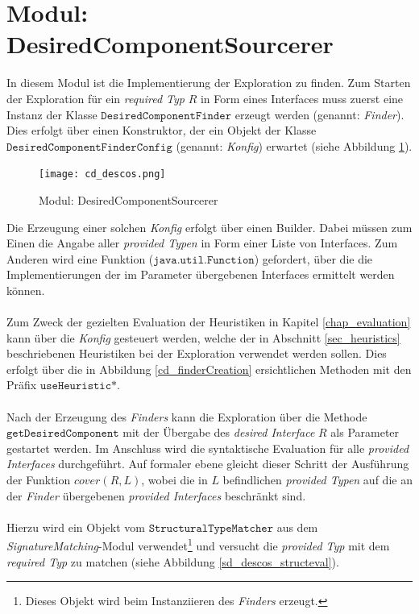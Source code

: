 \section{Modul: DesiredComponentSourcerer}\label{sec_impl_descos}
In diesem Modul ist die Implementierung der Exploration zu finden. Zum Starten der Exploration für ein \emph{required Typ} $R$ in Form eines Interfaces muss zuerst eine Instanz der Klasse $\texttt{DesiredComponentFinder}$ erzeugt werden (genannt: \emph{Finder}). Dies erfolgt über einen Konstruktor, der ein Objekt der Klasse $\texttt{DesiredComponentFinderConfig}$ (genannt: \emph{Konfig}) erwartet (siehe Abbildung \ref{cd_descos}). 
\begin{figure}[h!]
\centering
\texttt{[image: cd\_descos.png]}
\caption{Modul: DesiredComponentSourcerer}
\label{cd_descos}
\end{figure}
\noindent
Die Erzeugung einer solchen \emph{Konfig} erfolgt über einen Builder. Dabei müssen zum Einen die Angabe aller \emph{provided Typen} in Form einer Liste von Interfaces. Zum Anderen wird eine Funktion ($\texttt{java.util.Function}$) gefordert, über die die Implementierungen der im Parameter übergebenen Interfaces ermittelt werden können.
\\\\
Zum Zweck der gezielten Evaluation der Heuristiken in Kapitel \ref{chap_evaluation} kann über die \emph{Konfig} gesteuert werden, welche der in Abschnitt \ref{sec_heuristics} beschriebenen Heuristiken bei der Exploration verwendet werden sollen. Dies erfolgt über die in Abbildung \ref{cd_finderCreation} ersichtlichen Methoden mit den Präfix $\texttt{useHeuristic*}$.
\\\\
Nach der Erzeugung des \emph{Finders} kann die Exploration über die Methode $\texttt{getDesiredComponent}$ mit der Übergabe des \emph{desired Interface} $R$ als Parameter gestartet werden. Im Anschluss wird die syntaktische Evaluation für alle \emph{provided Interfaces} durchgeführt. Auf formaler ebene gleicht dieser Schritt der Ausführung der Funktion $\mathit{cover(R,L)}$, wobei die in $L$ befindlichen \emph{provided Typen} auf die an der \emph{Finder} übergebenen \emph{provided Interfaces} beschränkt sind.
\\\\
Hierzu wird ein Objekt vom $\texttt{StructuralTypeMatcher}$ aus dem \emph{SignatureMatching}-Modul verwendet\footnote{Dieses Objekt wird beim Instanziieren des \emph{Finders} erzeugt.} und versucht die \emph{provided Typ} mit dem \emph{required Typ} zu matchen (siehe Abbildung \ref{sd_descos_structeval}).
